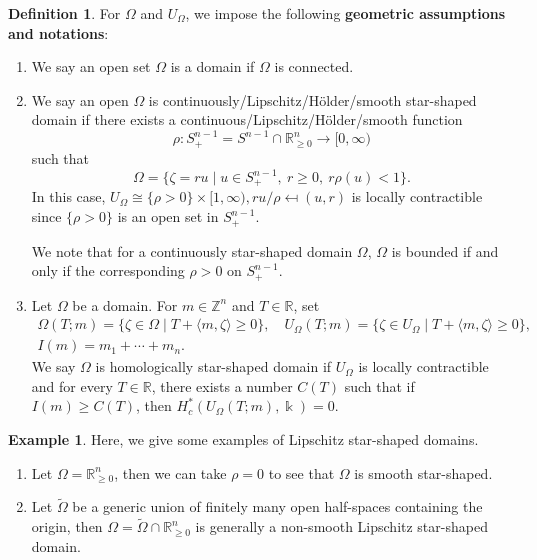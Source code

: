 \documentclass[11pt]{amsart}
\numberwithin{equation}{section}
\theoremstyle{plain}
\theoremstyle{definition}
\newtheorem{Def}[def]{Definition}
\newtheorem{eg}[Eg]{Example}
\theoremstyle{remark}
\newcommand{\bZ} { {\mathbb{Z}}}
\newcommand{\bR} { {\mathbb{R}}}
\begin{document}
\begin{Def}
For $\Omega$ and $U_\Omega$, we impose the following \textbf{geometric assumptions and notations}:
\begin{enumerate}[fullwidth]
    \item We say an open set $\Omega$ is a domain if  $\Omega$ is connected.
    
    \item We say an open $\Omega$ is continuously/Lipschitz/H\"older/smooth star-shaped domain if there exists a continuous/Lipschitz/H\"older/smooth function
    \[\rho: S^{n-1}_+=S^{n-1}\cap\bR_{\geq0}^n\to [0,\infty) \]
    such that 
    \[\Omega=\{\zeta=ru\mid u\in S^{n-1}_+, ~r\geq 0,~ r\rho(u)<1\}.\]
    In this case, $ U_\Omega\cong \{\rho>0\}\times [1,\infty) , ru/\rho\mapsfrom (u,r)$ is locally contractible since $\{\rho>0\}$ is an open set in $S^{n-1}_+$.

    We note that for a continuously star-shaped domain $\Omega$, $\Omega$ is bounded if and only if the corresponding $\rho>0$ on $S^{n-1}_+$.

    \item Let $\Omega$ be a domain. For $m\in\bZ^n$ and $T\in\bR$, set
\begin{gather*}
    \Omega(T;m)=\{\zeta\in \Omega\mid T+\langle m,\zeta\rangle\geq 0\},\quad U_\Omega(T;m)=\{\zeta\in U_\Omega\mid T+\langle m,\zeta\rangle\geq 0\},\\
    I(m)=m_1+\cdots+m_n.
\end{gather*}
  We say $\Omega$ is homologically star-shaped domain if $U_\Omega$ is locally contractible and for every $T\in \bR$, there exists a number $C(T)$ such that if $I(m)\geq C(T)$, then $H^*_c(U_\Omega(T;m),\Bbbk)=0$.
\end{enumerate}
\end{Def}

\begin{eg}Here, we give some examples of Lipschitz star-shaped domains.
\begin{enumerate}
    \item Let $\Omega=\bR^{n}_{\geq0}$, then we can take $\rho=0$ to see that $\Omega$ is smooth star-shaped.
    \item Let $\widetilde{\Omega}$ be a generic union of finitely many open half-spaces containing the origin, then $\Omega=\widetilde{\Omega}\cap \bR^{n}_{\geq0}$ is generally a non-smooth Lipschitz star-shaped domain.\end{enumerate}
\end{eg}
\end{document}
